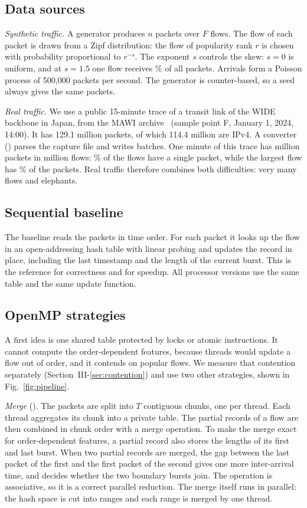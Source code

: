 \subsection{Data sources}
\emph{Synthetic traffic.} A generator produces $n$ packets over $F$ flows. The
flow of each packet is drawn from a Zipf distribution: the flow of popularity
rank $r$ is chosen with probability proportional to $r^{-s}$. The exponent $s$
controls the skew: $s=0$ is uniform, and at $s=1.5$ one flow receives
\topshareHi\% of all packets. Arrivals form a Poisson process of 500{,}000
packets per second. The generator is counter-based, so a seed always gives the
same packets.

\emph{Real traffic.} We use a public 15-minute trace of a transit link of the
WIDE backbone in Japan, from the MAWI archive~\cite{mawi} (sample point F,
January 1, 2024, 14:00). It has 129.1 million packets, of which 114.4 million
are IPv4. A converter () parses the capture file and writes
batches. One minute of this trace has \realN{} million packets in \realF{}
million flows: \realSingle\% of the flows have a single packet, while the
largest flow has \realTop\% of the packets. Real traffic therefore combines
both difficulties: very many flows and elephants.

\subsection{Sequential baseline}
The baseline reads the packets in time order. For each packet it looks up the
flow in an open-addressing hash table with linear probing and updates the
record in place, including the last timestamp and the length of the current
burst. This is the reference for correctness and for speedup. All processor
versions use the same table and the same update function.

\subsection{OpenMP strategies}
A first idea is one shared table protected by locks or atomic instructions. It
cannot compute the order-dependent features, because threads would update a
flow out of order, and it contends on popular flows. We measure that contention
separately (Section~III-\ref{sec:contention}) and use two other strategies, shown in
Fig.~\ref{fig:pipeline}.

\emph{Merge} (). The packets are split into $T$ contiguous
chunks, one per thread. Each thread aggregates its chunk into a private table.
The partial records of a flow are then combined in chunk order with a merge
operation. To make the merge exact for order-dependent features, a partial
record also stores the lengths of its first and last burst. When two partial
records are merged, the gap between the last packet of the first and the first
packet of the second gives one more inter-arrival time, and decides whether
the two boundary bursts join. The operation is associative, so it is a correct
parallel reduction. The merge itself runs in parallel: the hash space is cut
into ranges and each range is merged by one thread.

